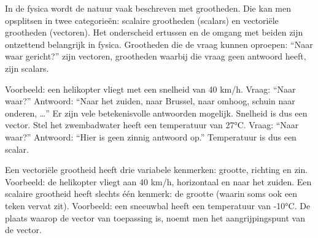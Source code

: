 \documentclass{ximera}
\begin{document}
	\author{Bart Lambregs}
    \xmsource\xmuitleg


In de fysica wordt de natuur vaak beschreven met grootheden. Die kan men opsplitsen in twee categorieën: scalaire grootheden (scalars) en vectoriële grootheden (vectoren). 
Het onderscheid ertussen en de omgang met beiden zijn ontzettend belangrijk in fysica.
Grootheden die de vraag kunnen oproepen: “Naar waar gericht?” zijn vectoren, grootheden waarbij die vraag geen antwoord heeft, zijn scalars. 


Voorbeeld: een helikopter vliegt met een snelheid van 40 km/h. 
Vraag: “Naar waar?” Antwoord: “Naar het zuiden, naar Brussel, naar omhoog, schuin naar onderen, …” 
Er zijn vele betekenisvolle antwoorden mogelijk. 
Snelheid is dus een vector. 
Stel het zwembadwater heeft een temperatuur van 27°C. 
Vraag: “Naar waar?” Antwoord: “Hier is geen zinnig antwoord op.” 
Temperatuur is dus een scalar.

Een vectoriële grootheid heeft drie variabele kenmerken: grootte, richting en zin. 
Voorbeeld: de helikopter vliegt aan 40 km/h, horizontaal en naar het zuiden. 
Een scalaire grootheid heeft slechts één kenmerk: de grootte (waarin soms ook een teken vervat zit). 
Voorbeeld: een sneeuwbal heeft een temperatuur van -10°C.
De plaats waarop de vector van toepassing is, noemt men het aangrijpingspunt van de vector.


	
\end{document}
